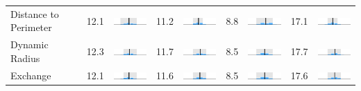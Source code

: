 \begin{table}
\begin{tabular}{l rm{7em} rm{7em} rm{7em} rm{7em}}
Distance to Perimeter  &  12.1 &     \includegraphics[width=7em]{mini_hist/TX_senate_2008_rohrbach} &  11.2 &     \includegraphics[width=7em]{mini_hist/TX_senate_2012_rohrbach} &   8.8 &     \includegraphics[width=7em]{mini_hist/TX_senate_2014_rohrbach} &  17.1 &     \includegraphics[width=7em]{mini_hist/TX_senate_2018_rohrbach} \\
Dynamic Radius         &  12.3 &   \includegraphics[width=7em]{mini_hist/TX_senate_2008_dyn_radius} &  11.7 &   \includegraphics[width=7em]{mini_hist/TX_senate_2012_dyn_radius} &   8.5 &   \includegraphics[width=7em]{mini_hist/TX_senate_2014_dyn_radius} &  17.7 &   \includegraphics[width=7em]{mini_hist/TX_senate_2018_dyn_radius} \\
Exchange               &  12.1 &     \includegraphics[width=7em]{mini_hist/TX_senate_2008_exchange} &  11.6 &     \includegraphics[width=7em]{mini_hist/TX_senate_2012_exchange} &   8.5 &     \includegraphics[width=7em]{mini_hist/TX_senate_2014_exchange} &  17.6 &     \includegraphics[width=7em]{mini_hist/TX_senate_2018_exchange} \\

\end{tabular}
\end{table}
